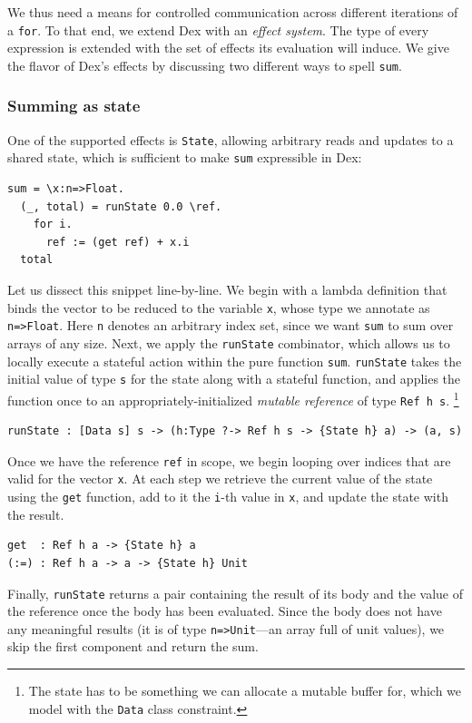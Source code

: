 \documentclass[acmsmall,screen,nonacm]{acmart}
\newlength{\codeindent}
\newcommand{\ttt}[1]{\texttt{#1}}
\newcommand{\codelinesize}{\normalsize}
\begin{document}
We thus need a means for controlled communication across different iterations of a \texttt{for}.
To that end, we extend Dex with an \emph{effect system}.
The type of every expression is extended with the set of effects its evaluation will induce.
We give the flavor of Dex's effects by discussing two different ways to spell \texttt{sum}.

\subsubsection{Summing as state}
\label{sec:sum-via-state}
One of the supported effects is \texttt{State}, allowing arbitrary reads and updates to a shared state, which is sufficient to make \texttt{sum} expressible in Dex:
\begin{Verbatim}[xleftmargin=\codeindent,fontsize=\small]
sum = \x:n=>Float.
  (_, total) = runState 0.0 \ref.
    for i.
      ref := (get ref) + x.i
  total
\end{Verbatim}
Let us dissect this snippet line-by-line.
We begin with a lambda definition that binds the vector to be reduced to the variable \texttt{x}, whose type we annotate as \ttt{n=>Float}.
Here \ttt{n} denotes an arbitrary index set, since we want \ttt{sum} to sum over arrays of any size.
Next, we apply the \texttt{runState} combinator, which allows us to locally execute a stateful action within the pure function \texttt{sum}.
\texttt{runState} takes the initial value of type \ttt{s} for the state along with a stateful function, and applies the function once to an appropriately-initialized \emph{mutable reference} of type \ttt{Ref h s}.%
\footnote{The state has to be something we can allocate a mutable buffer for, which we model with the \ttt{Data} class constraint.}
\begin{Verbatim}[xleftmargin=\codeindent,fontsize=\codelinesize]
runState : [Data s] s -> (h:Type ?-> Ref h s -> {State h} a) -> (a, s)
\end{Verbatim}
Once we have the reference \ttt{ref} in scope, we begin looping over indices that are valid for the vector \texttt{x}.
At each step we retrieve the current value of the state using the \texttt{get} function, add to it the \texttt{i}-th value in \texttt{x}, and update the state with the result.
\begin{Verbatim}[xleftmargin=\codeindent,fontsize=\small]
get  : Ref h a -> {State h} a
(:=) : Ref h a -> a -> {State h} Unit
\end{Verbatim}
Finally, \texttt{runState} returns a pair containing the result of its body and the value of the reference once the body has been evaluated.
Since the body does not have any meaningful results (it is of type \texttt{n=>Unit}---an array full of unit values), we skip the first component and return the sum.
\end{document}
